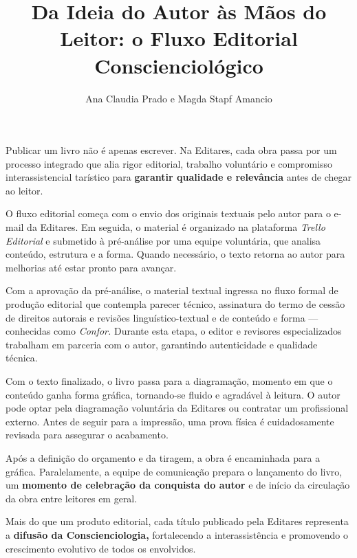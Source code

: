 \documentclass{gescons}
\author{Ana Claudia Prado e Magda Stapf Amancio}
\title{Da Ideia do Autor às Mãos do Leitor: o Fluxo Editorial Conscienciológico}
\begin{document}
    \makeentrevistatitle


    


Publicar um livro não é apenas escrever. Na Editares, cada obra passa por um processo integrado que alia rigor editorial, trabalho voluntário e compromisso interassistencial tarístico para \textbf{garantir qualidade e relevância} antes de chegar ao leitor.

O fluxo editorial começa com o envio dos originais textuais pelo autor para o e-mail da Editares. Em seguida, o material é organizado na plataforma \emph{Trello Editorial} e submetido à pré-análise por uma equipe voluntária, que analisa conteúdo, estrutura e a forma. Quando necessário, o texto retorna ao autor para melhorias até estar pronto para avançar.

Com a aprovação da pré-análise, o material textual ingressa no fluxo formal de produção editorial que contempla parecer técnico, assinatura do termo de cessão de direitos autorais e revisões linguístico-textual e de conteúdo e forma --- conhecidas como \emph{Confor.} Durante esta etapa, o editor e revisores especializados trabalham em parceria com o autor, garantindo autenticidade e qualidade técnica.

Com o texto finalizado, o livro passa para a diagramação, momento em que o conteúdo ganha forma gráfica, tornando-se fluido e agradável à leitura. O autor pode optar pela diagramação voluntária da Editares ou contratar um profissional externo. Antes de seguir para a impressão, uma prova física é cuidadosamente revisada para assegurar o acabamento.

Após a definição do orçamento e da tiragem, a obra é encaminhada para a gráfica. Paralelamente, a equipe de comunicação prepara o lançamento do livro, um \textbf{momento de celebração da conquista do autor} e de início da circulação da obra entre leitores em geral.

Mais do que um produto editorial, cada título publicado pela Editares representa a \textbf{difusão da Conscienciologia,} fortalecendo a interassistência e promovendo o crescimento evolutivo de todos os envolvidos.
\end{document}
